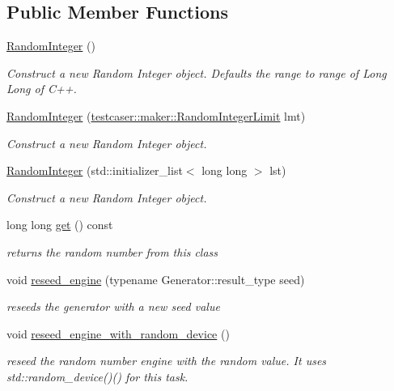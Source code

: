 \subsection*{Public Member Functions}
\begin{DoxyCompactItemize}
\item 
\mbox{\hyperlink{classtestcaser_1_1maker_1_1types_1_1RandomInteger_aee8b13d2d5bad5355924313b56d321c4}{Random\+Integer}} ()
\begin{DoxyCompactList}\small\item\em Construct a new Random Integer object. Defaults the range to range of Long Long of C++. \end{DoxyCompactList}\item 
\mbox{\hyperlink{classtestcaser_1_1maker_1_1types_1_1RandomInteger_a026bc0b7613813494afce8066fb997ea}{Random\+Integer}} (\mbox{\hyperlink{classtestcaser_1_1maker_1_1RandomIntegerLimit}{testcaser\+::maker\+::\+Random\+Integer\+Limit}} lmt)
\begin{DoxyCompactList}\small\item\em Construct a new Random Integer object. \end{DoxyCompactList}\item 
\mbox{\hyperlink{classtestcaser_1_1maker_1_1types_1_1RandomInteger_ae126be1bc8d04520b063924e57ccedc6}{Random\+Integer}} (std\+::initializer\+\_\+list$<$ long long $>$ lst)
\begin{DoxyCompactList}\small\item\em Construct a new Random Integer object. \end{DoxyCompactList}\item 
long long \mbox{\hyperlink{classtestcaser_1_1maker_1_1types_1_1RandomInteger_a3b7754ca1c579f58b959ca6adb483a51}{get}} () const
\begin{DoxyCompactList}\small\item\em returns the random number from this class \end{DoxyCompactList}\item 
void \mbox{\hyperlink{classtestcaser_1_1maker_1_1types_1_1RandomInteger_a86d3dace9ceb412e5337da90818da7b6}{reseed\+\_\+engine}} (typename Generator\+::result\+\_\+type seed)
\begin{DoxyCompactList}\small\item\em reseeds the generator with a new seed value \end{DoxyCompactList}\item 
void \mbox{\hyperlink{classtestcaser_1_1maker_1_1types_1_1RandomInteger_acf2d349fda6b89bad9f0de71947a637e}{reseed\+\_\+engine\+\_\+with\+\_\+random\+\_\+device}} ()
\begin{DoxyCompactList}\small\item\em reseed the random number engine with the random value. It uses std\+::random\+\_\+device()() for this task. \end{DoxyCompactList}\end{DoxyCompactItemize}


